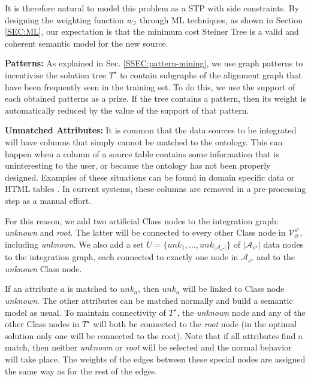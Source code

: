 \documentclass[letterpaper]{article} %
\newcommand{\authornote}[3]{
  {\fbox{\sc 
  #1}:$\blacktriangleright$\textcolor{#2}{\small{#3}}$\blacktriangleleft$}%
}
\newcommand{\ddg}[1]{\authornote{DDG}{blue}{#1}}
\newcommand{\forijcai}[1]{}
\begin{document}
It is therefore natural to model this problem as a STP with side constraints.
By designing the weighting function $w_\mathcal{I}$ through 
ML techniques, as shown in Section \ref{SEC:ML}, 
our expectation is that the minimum cost Steiner Tree is a valid and coherent semantic model for the new source.

\textbf{Patterns:}
As explained in Sec. \ref{SSEC:pattern-mining}, we use 
graph patterns to incentivise the solution tree 
$T^\star$ to contain subgraphs of the alignment graph that have been frequently 
seen in the training set.
To do this, we use the support of each obtained patterns as a prize. If 
the tree contains a pattern, then its weight is automatically reduced by the 
value of the support of that pattern. \forijcai{Sec. \ref{SEC:rel2ontocp} shows how this is integrated in the model.}

\textbf{Unmatched Attributes:}
It is common that the data sources to be integrated will have columns that 
simply cannot be matched to the ontology.
This can happen when a column of a source table contains some information that 
is uninteresting to the user, or because the ontology has not been properly 
designed. 
Examples of these situations can be found in domain specific data 
\cite{Pham:semantic} or HTML tables \cite{Ritze:matching}.
In current systems, these columns are removed in a pre-processing step as a manual effort.

For this reason, we add two artificial Class nodes to the integration graph:  
\emph{unknown} and \emph{root}. 
The latter will be connected to every other Class node in 
$\mathcal{V}_\mathcal{O}^{s^\star}$, including \emph{unknown}.
We also add a set $U = \{unk_1,...,unk_{|\mathcal{A}_{s^\star}|}\}$ of 
$|\mathcal{A}_{s^\star}|$ data 
nodes to the integration graph, each connected to exactly one node in 
$\mathcal{A}_{s^\star}$ and to the \emph{unknown} Class node.  

If an attribute $a$ is matched to $unk_a$, then $unk_a$ will be linked to Class 
node \emph{unknown}. 
The other attributes can be matched normally 
and build a semantic model as usual. 
To maintain connectivity of $T^\star$, the \emph{unknown} node and any  of the other Class nodes in $T^\star$ will both be connected to the \emph{root} node (in the optimal solution only one will be connected to the root). 
Note that if all attributes find a 
match, then neither \emph{unknown} or \emph{root} will be selected and the normal behavior will take place.
The weights of the edges between these special nodes are
assigned the same way as for the rest of the edges.
\end{document}
